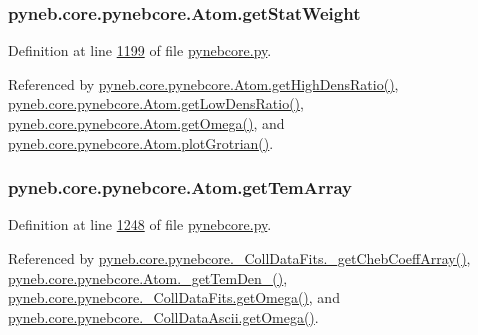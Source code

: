 \hypertarget{classpyneb_1_1core_1_1pynebcore_1_1_atom_a0f2483487115f19556586b9e422bd5fb}{}
\subsubsection[{get\+Stat\+Weight}]{\setlength{\rightskip}{0pt plus 5cm}pyneb.\+core.\+pynebcore.\+Atom.\+get\+Stat\+Weight}\label{classpyneb_1_1core_1_1pynebcore_1_1_atom_a0f2483487115f19556586b9e422bd5fb}


Definition at line \hyperlink{pynebcore_8py_source_l01199}{1199} of file \hyperlink{pynebcore_8py_source}{pynebcore.\+py}.



Referenced by \hyperlink{pynebcore_8py_source_l01653}{pyneb.\+core.\+pynebcore.\+Atom.\+get\+High\+Dens\+Ratio()}, \hyperlink{pynebcore_8py_source_l01632}{pyneb.\+core.\+pynebcore.\+Atom.\+get\+Low\+Dens\+Ratio()}, \hyperlink{pynebcore_8py_source_l01262}{pyneb.\+core.\+pynebcore.\+Atom.\+get\+Omega()}, and \hyperlink{pynebcore_8py_source_l02372}{pyneb.\+core.\+pynebcore.\+Atom.\+plot\+Grotrian()}.

\hypertarget{classpyneb_1_1core_1_1pynebcore_1_1_atom_a764cc048a87d3d89204a616774bdaac6}{}
\subsubsection[{get\+Tem\+Array}]{\setlength{\rightskip}{0pt plus 5cm}pyneb.\+core.\+pynebcore.\+Atom.\+get\+Tem\+Array}\label{classpyneb_1_1core_1_1pynebcore_1_1_atom_a764cc048a87d3d89204a616774bdaac6}


Definition at line \hyperlink{pynebcore_8py_source_l01248}{1248} of file \hyperlink{pynebcore_8py_source}{pynebcore.\+py}.



Referenced by \hyperlink{pynebcore_8py_source_l00734}{pyneb.\+core.\+pynebcore.\+\_\+\+Coll\+Data\+Fits.\+\_\+get\+Cheb\+Coeff\+Array()}, \hyperlink{pynebcore_8py_source_l01803}{pyneb.\+core.\+pynebcore.\+Atom.\+\_\+get\+Tem\+Den\+\_()}, \hyperlink{pynebcore_8py_source_l00811}{pyneb.\+core.\+pynebcore.\+\_\+\+Coll\+Data\+Fits.\+get\+Omega()}, and \hyperlink{pynebcore_8py_source_l01063}{pyneb.\+core.\+pynebcore.\+\_\+\+Coll\+Data\+Ascii.\+get\+Omega()}.

